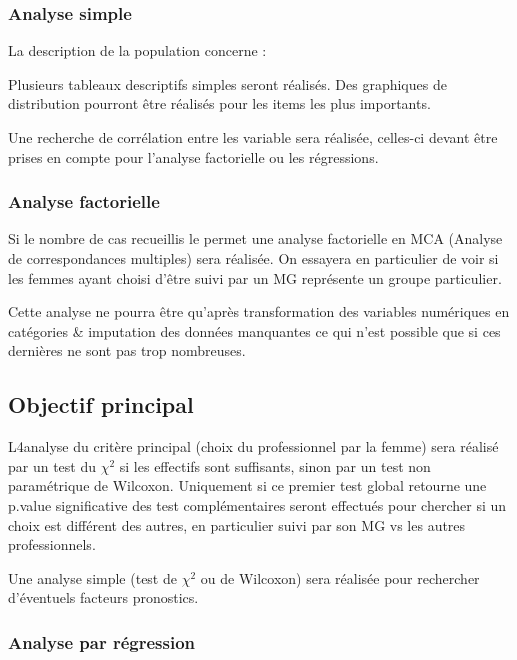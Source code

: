 \documentclass[
  a4paperpaper,
  french]{scrartcl}
\begin{document}
\hypertarget{analyse-simple}{%
\subsubsection{Analyse simple}\label{analyse-simple}}

La description de la population concerne :

Plusieurs tableaux descriptifs simples seront réalisés. Des graphiques
de distribution pourront être réalisés pour les items les plus
importants.

Une recherche de corrélation entre les variable sera réalisée, celles-ci
devant être prises en compte pour l'analyse factorielle ou les
régressions.

\hypertarget{analyse-factorielle}{%
\subsubsection{Analyse factorielle}\label{analyse-factorielle}}

Si le nombre de cas recueillis le permet une analyse factorielle en MCA
(Analyse de correspondances multiples) sera réalisée. On essayera en
particulier de voir si les femmes ayant choisi d'être suivi par un MG
représente un groupe particulier.

Cette analyse ne pourra être qu'après transformation des variables
numériques en catégories \& imputation des données manquantes ce qui
n'est possible que si ces dernières ne sont pas trop nombreuses.

\hypertarget{objectif-principal}{%
\subsection{Objectif principal}\label{objectif-principal}}

L4analyse du critère principal (choix du professionnel par la femme)
sera réalisé par un test du \(\chi^2\) si les effectifs sont suffisants,
sinon par un test non paramétrique de Wilcoxon. Uniquement si ce premier
test global retourne une p.value significative des test complémentaires
seront effectués pour chercher si un choix est différent des autres, en
particulier suivi par son MG vs les autres professionnels.

Une analyse simple (test de \(\chi^2\) ou de Wilcoxon) sera réalisée
pour rechercher d'éventuels facteurs pronostics.

\hypertarget{analyse-par-ruxe9gression}{%
\subsubsection{Analyse par régression}\label{analyse-par-ruxe9gression}}
\end{document}
